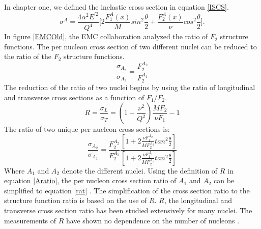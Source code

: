 \paragraph{}In chapter one, we defined the inelastic cross section in equation \ref{ISCS}.  
\begin{equation}
\label{ISCSch2}
\sigma^A=\frac{4\alpha^2E^{\prime 2}}{Q^4} \bigg\lbrack 2\frac{F_1^A(x)}{M}sin^2\frac{\theta}{2} + \frac{F_2^A(x)}{\nu}cos^2\frac{\theta}{2} \bigg \rbrack.
\end{equation} 
In figure \ref{EMCOld}, the EMC collaboration analyzed the ratio of $F_2$ structure functions. The per nucleon cross section of two different nuclei can be reduced to the ratio of the $F_2$ structure functions.  
\begin{equation}
\label{rat}
\frac{\sigma_{A_2}}{\sigma_{A_1}} = \frac{F_2^{A_2}}{F_2^{A_1}}
\end{equation}
The reduction of the ratio of two nuclei begins by using the ratio of longitudinal and transverse cross sections as a function of $F_1/F_2$.
\begin{equation}
R=\frac{\sigma_{L}}{\sigma_{T}} =\left(1+\frac{\nu^2}{Q^2} \right)\frac{MF_2}{\nu F_1} -1
\label{Rratio}
\end{equation}
The ratio of two unique per nucleon cross sections is:
\begin{equation}
\label{Aratio}
\frac{\sigma_{A_2}}{\sigma_{A_1}} = \frac{F_2^{A_2}}{F_2^{A_1}} \frac{\left[1+ 2\frac{\nu F_1^{A_2} }{MF_2^{A_2}} tan^2\frac{\theta}{2} \right]}{\left[1+ 2\frac{\nu F_1^{A_1} }{MF_2^{A_1}} tan^2\frac{\theta}{2} \right]}
\end{equation}
Where $A_1$ and $A_2$ denote the different nuclei. Using the definition of $R$ in equation \ref{Aratio}, the per nucleon cross section ratio of $A_1$ and $A_2$ can be simplified to equation \ref{rat} \cite{EM,seelyth}. The simplification of the cross section ratio to the structure function ratio is based on the use of $R$. $R$, the longitudinal and transverse cross section ratio has been studied extensively for many nuclei. The measurements of $R$ have shown no dependence on the number of nucleons \cite{EM}. 

